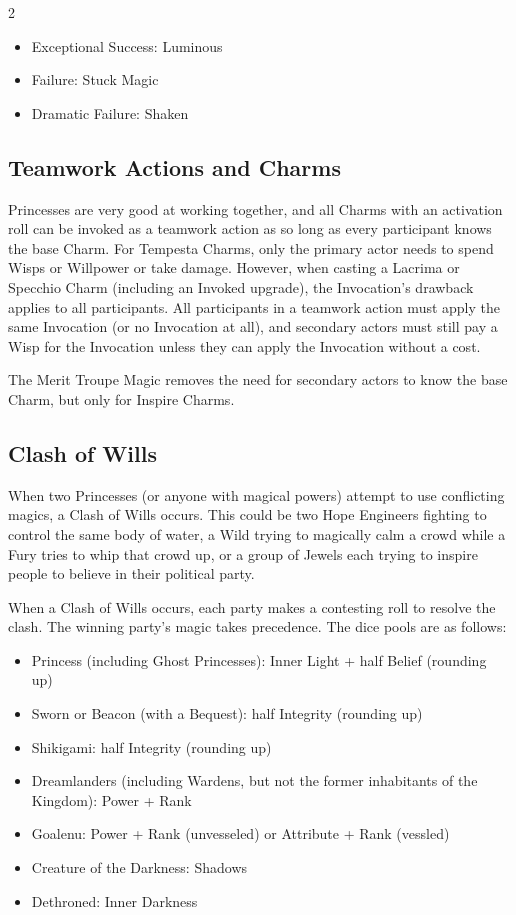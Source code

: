 \begin{multicols}{2}
\begin{itemize}
 \item Exceptional Success: Luminous
 \item Failure: Stuck Magic
 \item Dramatic Failure: Shaken
\end{itemize}

\subsection*{Teamwork Actions and Charms}

Princesses are very good at working together, and all Charms with an activation roll can be invoked as a teamwork action as so long as every participant knows the base Charm. For Tempesta Charms, only the primary actor needs to spend Wisps or Willpower or take damage. However, when casting a Lacrima or Specchio Charm (including an Invoked upgrade), the Invocation's drawback applies to all participants. All participants in a teamwork action must apply the same Invocation (or no Invocation at all), and secondary actors must still pay a Wisp for the Invocation unless they can apply the Invocation without a cost. 

The Merit Troupe Magic removes the need for secondary actors to know the base Charm, but only for Inspire Charms. 

\subsection*{Clash of Wills}

When two Princesses (or anyone with magical powers) attempt to use conflicting magics, a Clash of Wills occurs. This could be two Hope Engineers fighting to control the same body of water, a Wild trying to magically calm a crowd while a Fury tries to whip that crowd up, or a group of Jewels each trying to inspire people to believe in their political party. 

When a Clash of Wills occurs, each party makes a contesting roll to resolve the clash. The winning party's magic takes precedence. The dice pools are as follows: 
\begin{itemize} 
\item Princess (including Ghost Princesses): Inner Light + half Belief (rounding up)
\item Sworn or Beacon (with a Bequest): half Integrity (rounding up)
\item Shikigami: half Integrity (rounding up)
\item Dreamlanders (including Wardens, but not the former inhabitants of the Kingdom): Power + Rank
\item Goalenu: Power + Rank (unvesseled) or Attribute + Rank (vessled)
\item Creature of the Darkness: Shadows
\item Dethroned: Inner Darkness
\end{itemize}


\end{multicols}

